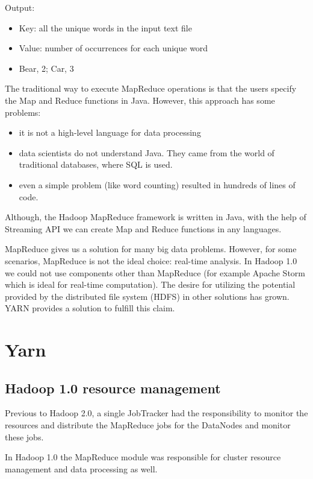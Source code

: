 \noindent Output:
\begin{itemize}
	\item Key: all the unique words in the input text file
	\item Value: number of occurrences for each unique word
	\item \eg  Bear, 2; Car, 3
\end{itemize}

The traditional way to execute MapReduce operations is that the users specify the Map and Reduce functions in Java. However, this approach has some problems:
\begin{itemize}
	\item it is not a high-level language for data processing
	\item data scientists do not understand Java. They came from the world of traditional databases, where SQL is used.
	\item even a simple problem (like word counting) resulted in hundreds of lines of code.
\end{itemize}

Although, the Hadoop MapReduce framework is written in Java, with the help of Streaming API we can create Map and Reduce functions in any languages.

MapReduce gives us a solution for many big data problems. However, for some scenarios, MapReduce is not the ideal choice: \eg real-time analysis. In Hadoop 1.0 we could not use components other than MapReduce (for example Apache Storm which is ideal for real-time computation). The desire for utilizing the potential provided by the distributed file system (HDFS) in other solutions has grown. YARN provides a solution to fulfill this claim.

\section{Yarn \cite{YARN}}
\subsection{Hadoop 1.0 resource management}
Previous to Hadoop 2.0, a single JobTracker had the responsibility to monitor the resources and distribute the MapReduce jobs for the DataNodes and monitor these jobs. 

In Hadoop 1.0 the MapReduce module was responsible for cluster resource management and data processing as well.

